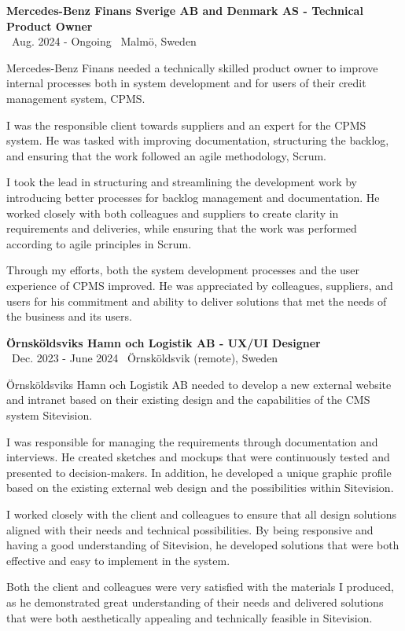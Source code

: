 \documentclass[a4paper,10pt]{article}
\begin{document}
\textbf{Mercedes-Benz Finans Sverige AB and Denmark AS - Technical Product Owner}\\
\normalsize \faCalendar \ Aug. 2024 - Ongoing \quad \faMapMarker \ Malmö, Sweden

Mercedes-Benz Finans needed a technically skilled product owner to improve internal processes both in system development and for users of their credit management system, CPMS.

I was the responsible client towards suppliers and an expert for the CPMS system. He was tasked with improving documentation, structuring the backlog, and ensuring that the work followed an agile methodology, Scrum.

I took the lead in structuring and streamlining the development work by introducing better processes for backlog management and documentation. He worked closely with both colleagues and suppliers to create clarity in requirements and deliveries, while ensuring that the work was performed according to agile principles in Scrum.

Through my efforts, both the system development processes and the user experience of CPMS improved. He was appreciated by colleagues, suppliers, and users for his commitment and ability to deliver solutions that met the needs of the business and its users.

\vspace{0.5cm}
\textbf{Örnsköldsviks Hamn och Logistik AB - UX/UI Designer}\\
\normalsize \faCalendar \ Dec. 2023 - June 2024 \quad \faMapMarker \ Örnsköldsvik (remote), Sweden

Örnsköldsviks Hamn och Logistik AB needed to develop a new external website and intranet based on their existing design and the capabilities of the CMS system Sitevision.

I was responsible for managing the requirements through documentation and interviews. He created sketches and mockups that were continuously tested and presented to decision-makers. In addition, he developed a unique graphic profile based on the existing external web design and the possibilities within Sitevision.

I worked closely with the client and colleagues to ensure that all design solutions aligned with their needs and technical possibilities. By being responsive and having a good understanding of Sitevision, he developed solutions that were both effective and easy to implement in the system.

Both the client and colleagues were very satisfied with the materials I produced, as he demonstrated great understanding of their needs and delivered solutions that were both aesthetically appealing and technically feasible in Sitevision.
\end{document}
